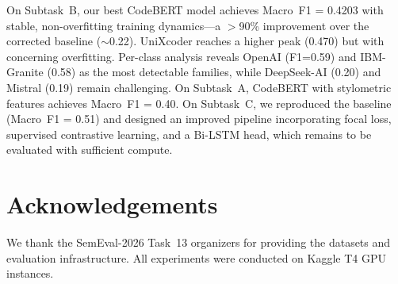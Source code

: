 \documentclass[11pt]{article}
\begin{document}
On Subtask~B, our best CodeBERT model achieves Macro~F1 = 0.4203 with stable, non-overfitting training dynamics---a $>$90\% improvement over the corrected baseline ($\sim$0.22). UniXcoder reaches a higher peak (0.470) but with concerning overfitting. Per-class analysis reveals OpenAI (F1=0.59) and IBM-Granite (0.58) as the most detectable families, while DeepSeek-AI (0.20) and Mistral (0.19) remain challenging. On Subtask~A, CodeBERT with stylometric features achieves Macro~F1 = 0.40. On Subtask~C, we reproduced the baseline (Macro~F1 = 0.51) and designed an improved pipeline incorporating focal loss, supervised contrastive learning, and a Bi-LSTM head, which remains to be evaluated with sufficient compute.

\section*{Acknowledgements}
We thank the SemEval-2026 Task~13 organizers for providing the datasets and evaluation infrastructure. All experiments were conducted on Kaggle T4 GPU instances.


\end{document}
